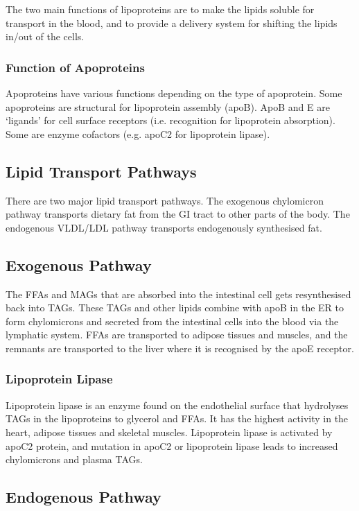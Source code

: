 The two main functions of lipoproteins are to make the lipids soluble for transport in the blood, and to provide a delivery system for shifting the lipids in/out of the cells.

\subsubsection{Function of Apoproteins}

Apoproteins have various functions depending on the type of apoprotein.
Some apoproteins are structural for lipoprotein assembly (apoB).
ApoB and E are `ligands' for cell surface receptors (i.e. recognition for lipoprotein absorption).
Some are enzyme cofactors (e.g. apoC2 for lipoprotein lipase).

\subsection{Lipid Transport Pathways}

There  are two major lipid transport pathways.
The exogenous chylomicron pathway transports dietary fat from the GI tract to other parts of the body.
The endogenous VLDL/LDL pathway transports endogenously synthesised fat.

\subsection{Exogenous Pathway}

The FFAs and MAGs that are absorbed into the intestinal cell gets resynthesised back into TAGs.
These TAGs and other lipids combine with apoB in the ER to form chylomicrons and secreted from the intestinal cells into the blood via the lymphatic system.
FFAs are transported to adipose tissues and muscles, and the remnants are transported to the liver where it is recognised by the apoE receptor.

\subsubsection{Lipoprotein Lipase}

Lipoprotein lipase is an enzyme found on the endothelial surface that hydrolyses TAGs in the lipoproteins to glycerol and FFAs.
It has the highest activity in the heart, adipose tissues and skeletal muscles.
Lipoprotein lipase is activated by apoC2 protein, and mutation in apoC2 or lipoprotein lipase leads to increased chylomicrons and plasma TAGs.

\subsection{Endogenous Pathway}

